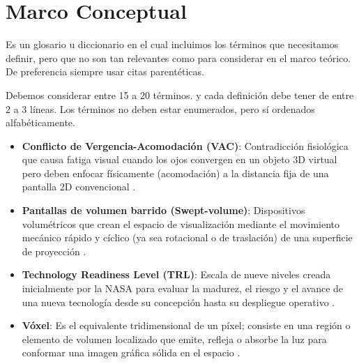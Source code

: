 \section{Marco Conceptual}
    \begin{sectext}
        Es un glosario u diccionario en el cual incluimos los términos que necesitamos definir, pero que no son tan relevantes como para considerar en el marco teórico. De preferencia siempre usar citas parentéticas.

        Debemos considerar entre 15 a 20 términos. y cada definición debe tener de entre 2 a 3 líneas. Los términos no deben estar enumerados, pero sí ordenados alfabéticamente.

        \begin{itemize}
        \item \textbf{Conflicto de Vergencia-Acomodación (VAC)}: Contradicción fisiológica que causa fatiga visual cuando los ojos convergen en un objeto 3D virtual pero deben enfocar físicamente (acomodación) a la distancia fija de una pantalla 2D convencional \parencite{blundell_uncertain_2017}.

        \item \textbf{Pantallas de volumen barrido (Swept-volume)}: Dispositivos volumétricos que crean el espacio de visualización mediante el movimiento mecánico rápido y cíclico (ya sea rotacional o de traslación) de una superficie de proyección \parencite{blundell_classification_2002}.
        
        \item \textbf{Technology Readiness Level (TRL)}: Escala de nueve niveles creada inicialmente por la NASA para evaluar la madurez, el riesgo y el avance de una nueva tecnología desde su concepción hasta su despliegue operativo \parencite{salazar_zegarra_taxonomitecnicas_2022}.

        \item \textbf{Vóxel}: Es el equivalente tridimensional de un píxel; consiste en una región o elemento de volumen localizado que emite, refleja o absorbe la luz para conformar una imagen gráfica sólida en el espacio \parencite{blundell_classification_2002}.
        \end{itemize}
    \end{sectext}
